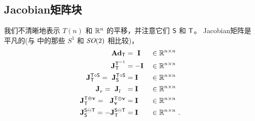 \subsection{Jacobian矩阵块}

我们不清晰地表示 $T(n)$ 和 ${\mathbb R}^n$ 的平移，并注意它们 $\mathsf S$ 和 $\mathsf T$。
Jacobian矩阵是平凡的(与  中的那些 $S^1$ 和 $\textit{SO}(2)$ 相比较)，
%
\begin{align}
{\mathbf{Ad}_{\mathsf T}}       
 &= ~{\bf I} 
 &&\in{\mathbb R}^{n\times n} \\
{{\bf J}^{\mathsf T^{-1}}_{\mathsf T}} 
 &= -{\bf I} 
 &&\in{\mathbb R}^{n\times n} \\
{{\bf J}^{\mathsf T\circ\mathsf S}_{\mathsf T}} = ~{{\bf J}^{\mathsf T\circ\mathsf S}_{\mathsf S}} 
 &= {\bf I} 
 &&\in{\mathbb R}^{n\times n} \\
{{\bf J}^{}_{r}} = ~{{\bf J}^{}_{l}} ~~
 &= {\bf I} 
 &&\in{\mathbb R}^{n\times n} \\
{{\bf J}^{\mathsf T\oplus{\bf v}}_{\mathsf T}} = ~~{{\bf J}^{\mathsf T\oplus{\bf v}}_{{\bf v}}} 
 &= {\bf I} 
 &&\in{\mathbb R}^{n\times n} \\
{{\bf J}^{\mathsf S\ominus\mathsf T}_{\mathsf S}} = -{{\bf J}^{\mathsf S\ominus\mathsf T}_{\mathsf T}} 
 &= {\bf I} 
 &&\in{\mathbb R}^{n\times n} 
~.
\end{align}

